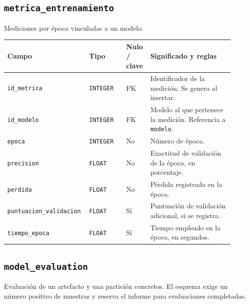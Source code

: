 \subsection*{\texttt{metrica\_\allowbreak{}entrenamiento}}

Mediciones por época vinculadas a un modelo.

\noindent
\begin{tabular}{@{}p{0.30\linewidth}p{0.16\linewidth}p{0.10\linewidth}p{0.36\linewidth}@{}}
\hline
\textbf{Campo} & \textbf{Tipo} & \textbf{Nulo / clave} & \textbf{Significado y reglas} \\
\hline
\texttt{id\_\allowbreak{}metrica} & \texttt{INTEGER} & PK & Identificador de la medición. Se genera al insertar. \\
\texttt{id\_\allowbreak{}modelo} & \texttt{INTEGER} & FK & Modelo al que pertenece la medición. Referencia a \texttt{modelo}. \\
\texttt{epoca} & \texttt{INTEGER} & No & Número de época. \\
\texttt{precision} & \texttt{FLOAT} & No & Exactitud de validación de la época, en porcentaje. \\
\texttt{perdida} & \texttt{FLOAT} & No & Pérdida registrada en la época. \\
\texttt{puntuacion\_\allowbreak{}validacion} & \texttt{FLOAT} & Sí & Puntuación de validación adicional, si se registra. \\
\texttt{tiempo\_\allowbreak{}epoca} & \texttt{FLOAT} & Sí & Tiempo empleado en la época, en segundos. \\
\hline
\end{tabular}

\subsection*{\texttt{model\_\allowbreak{}evaluation}}

Evaluación de un artefacto y una partición concretos. El esquema exige un número positivo de muestras y reserva el informe para evaluaciones completadas.

